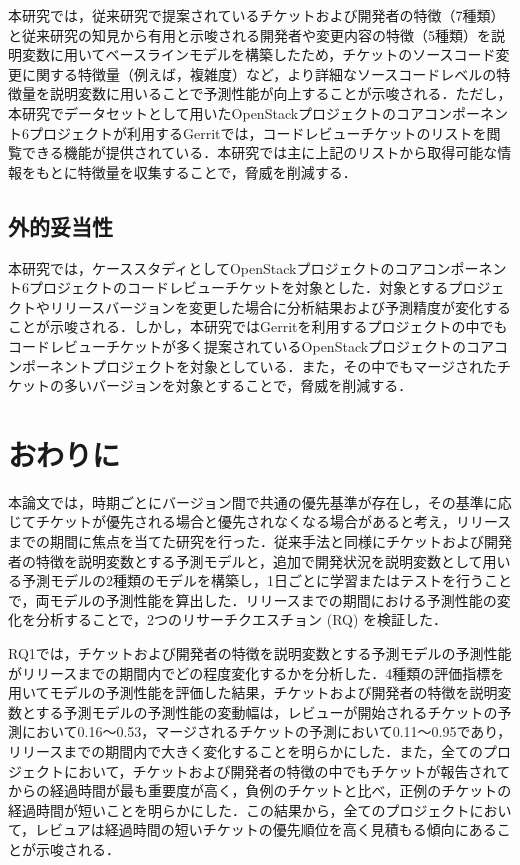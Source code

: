 \documentclass[11pt]{jreport}
\begin{document}
本研究では，従来研究\cite{prioritizer}で提案されているチケットおよび開発者の特徴（7種類）と従来研究\cite{release_merge}\cite{review1}の知見から有用と示唆される開発者や変更内容の特徴（5種類）を説明変数に用いてベースラインモデルを構築したため，チケットのソースコード変更に関する特徴量（例えば，複雑度）など，より詳細なソースコードレベルの特徴量を説明変数に用いることで予測性能が向上することが示唆される．ただし，本研究でデータセットとして用いたOpenStackプロジェクトのコアコンポーネント6プロジェクトが利用するGerritでは，コードレビューチケットのリストを閲覧できる機能が提供されている．本研究では主に上記のリストから取得可能な情報をもとに特徴量を収集することで，脅威を削減する．

\section{外的妥当性}
本研究では，ケーススタディとしてOpenStackプロジェクトのコアコンポーネント6プロジェクトのコードレビューチケットを対象とした．対象とするプロジェクトやリリースバージョンを変更した場合に分析結果および予測精度が変化することが示唆される．しかし，本研究ではGerritを利用するプロジェクトの中でもコードレビューチケットが多く提案されているOpenStackプロジェクトのコアコンポーネントプロジェクトを対象としている．また，その中でもマージされたチケットの多いバージョンを対象とすることで，脅威を削減する．


\chapter{おわりに}\label{sec:fig-tab-exp}
本論文では，時期ごとにバージョン間で共通の優先基準が存在し，その基準に応じてチケットが優先される場合と優先されなくなる場合があると考え，リリースまでの期間に焦点を当てた研究を行った．従来手法と同様にチケットおよび開発者の特徴を説明変数とする予測モデルと，追加で開発状況を説明変数として用いる予測モデルの2種類のモデルを構築し，1日ごとに学習またはテストを行うことで，両モデルの予測性能を算出した．リリースまでの期間における予測性能の変化を分析することで，2つのリサーチクエスチョン (RQ) を検証した．

RQ1では，チケットおよび開発者の特徴を説明変数とする予測モデルの予測性能がリリースまでの期間内でどの程度変化するかを分析した．4種類の評価指標を用いてモデルの予測性能を評価した結果，チケットおよび開発者の特徴を説明変数とする予測モデルの予測性能の変動幅は，レビューが開始されるチケットの予測において0.16〜0.53，マージされるチケットの予測において0.11〜0.95であり，リリースまでの期間内で大きく変化することを明らかにした．また，全てのプロジェクトにおいて，チケットおよび開発者の特徴の中でもチケットが報告されてからの経過時間が最も重要度が高く，負例のチケットと比べ，正例のチケットの経過時間が短いことを明らかにした．この結果から，全てのプロジェクトにおいて，レビュアは経過時間の短いチケットの優先順位を高く見積もる傾向にあることが示唆される．
\end{document}
